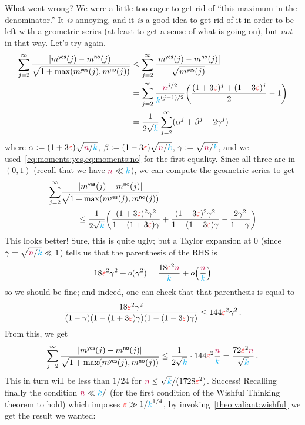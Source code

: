 \noindent What went wrong? We were a little too eager to get rid of ``this maximum in the denominator.'' It \emph{is} annoying, and it \emph{is} a good idea to get rid of it in order to be left with a geometric series (at least to get a sense of what is going on), but \emph{not} in that way. Let's try again.
\begin{align*}
\sum_{j=2}^\infty \frac{\abs{m^{\yes}(j)-m^{\no}(j)}}{\sqrt{1+\max(m^{\yes}(j),m^{\no}(j))}}
&\leq
\sum_{j=2}^\infty \frac{\abs{m^{\yes}(j)-m^{\no}(j)}}{\sqrt{m^{\yes}(j)}} \\
&= \sum_{j=2}^\infty \frac{\ns^{j/2}}{\ab^{{(j-1)/2}}}\Paren{ \frac{(1+3\dst)^j + (1-3\dst)^j}{2} - 1 } \\
&= \frac{1}{2\sqrt{\ab}}\sum_{j=2}^\infty (\alpha^j+\beta^j-2\gamma^j)
\end{align*}
where $\alpha := (1+3\textcolor{red}{\varepsilon})\sqrt{{\textcolor{purple}{n}}/{\textcolor{cyan}{k}}}$, $\beta := (1-3\textcolor{red}{\varepsilon})\sqrt{{\textcolor{purple}{n}}/{\textcolor{cyan}{k}}}$, $\gamma := \sqrt{{\textcolor{purple}{n}}/{\textcolor{cyan}{k}}}$, and we used~\cref{eq:moments:yes,eq:moments:no} for the first equality. Since all three are in $(0,1)$ (recall that we have ${\textcolor{purple}{n}} \ll {\textcolor{cyan}{k}}$), we can compute the geometric series to get
\begin{align*}
\sum_{j=2}^\infty &\frac{\abs{m^{\yes}(j)-m^{\no}(j)}}{\sqrt{1+\max(m^{\yes}(j),m^{\no}(j))}} \\
&\qquad\leq \frac{1}{2\sqrt{\ab}}\Paren{ \frac{(1+3\dst)^2\gamma^2}{1-(1+3\dst)\gamma}+\frac{(1-3\dst)^2\gamma^2}{1-(1-3\dst)\gamma}-\frac{2\gamma^2}{1-\gamma} }
\end{align*}
This looks better! Sure, this is quite ugly; but a Taylor expansion at $0$ (since $\gamma = \sqrt{{\textcolor{purple}{n}}/{\textcolor{cyan}{k}}} \ll 1$) tells us that the parenthesis of the RHS
is
\[
	18\dst^2 \gamma^2 + o(\gamma^2) = \frac{18\dst^2\ns}{\ab} + \littleO{\frac{\ns}{\ab}}
\]
so we should be fine; and indeed, one can check that that parenthesis is equal to
\begin{align*}
\frac{18\textcolor{red}{\varepsilon}^2\gamma^2}{(1-\gamma)(1-(1+3\textcolor{red}{\varepsilon})\gamma)(1-(1-3\textcolor{red}{\varepsilon})\gamma)} \leq 144 \textcolor{red}{\varepsilon}^2\gamma^2\,.
\end{align*}
From this, we get
\begin{equation}
	\sum_{j=2}^\infty \frac{\abs{m^{\yes}(j)-m^{\no}(j)}}{\sqrt{1+\max(m^{\yes}(j),m^{\no}(j))}}
	\leq \frac{1}{2\sqrt{\ab}} \cdot 144\dst^2\frac{\ns}{\ab} = \frac{72\dst^2\ns}{\sqrt{\ab}}\,.
\end{equation}
This in turn will be less than $1/24$ for ${\textcolor{purple}{n}} \leq \sqrt{{\textcolor{cyan}{k}}}/(1728\textcolor{red}{\varepsilon}^2)$. Success! Recalling finally the condition ${\textcolor{purple}{n}} \ll {\textcolor{cyan}{k}}/$ (for the first condition of the Wishful Thinking theorem to hold) which imposes $\textcolor{red}{\varepsilon} \gg 1/{\textcolor{cyan}{k}}^{1/4}$, by invoking~\cref{theo:valiant:wishful} we get the result we wanted:

